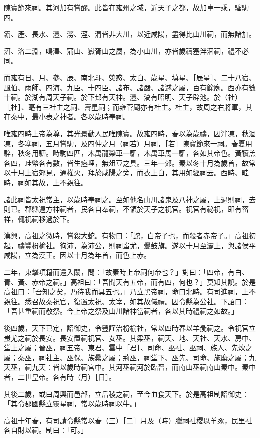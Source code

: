 \begin{pinyinscope}
陳寶節來祠。其河加有嘗醪。此皆在雍州之域，近天子之都，故加車一乘，騮駒四。

霸、產、長水、灃、澇、涇、渭皆非大川，以近咸陽，盡得比山川祠，而無諸加。

汧、洛二淵，鳴澤、蒲山、嶽胥山之屬，為小山川，亦皆歲禱塞泮涸祠，禮不必同。

而雍有日、月、參、辰、南北斗、熒惑、太白、歲星、填星、［辰星］、二十八宿、風伯、雨師、四海、九臣、十四臣、諸布、諸嚴、諸逑之屬，百有餘廟。西亦有數十祠。於湖有周天子祠。於下邽有天神。灃、滈有昭明、天子辟池。於（社）［杜］、亳有三社主之祠、壽星祠；而雍菅廟亦有杜主。杜主，故周之右將軍，其在秦中，最小表之神者。各以歲時奉祠。

唯雍四畤上帝為尊，其光景動人民唯陳寶。故雍四畤，春以為歲禱，因泮凍，秋涸凍，冬塞祠，五月嘗駒，及四仲之月（祠若）月祠，［若］陳寶節來一祠。春夏用騂，秋冬用駵。畤駒四匹，木禺龍欒車一駟，木禺車馬一駟，各如其帝色。黃犢羔各四，珪幣各有數，皆生瘞埋，無俎豆之具。三年一郊。秦以冬十月為歲首，故常以十月上宿郊見，通權火，拜於咸陽之旁，而衣上白，其用如經祠云。西畤、畦畤，祠如其故，上不親往。

諸此祠皆太祝常主，以歲時奉祠之。至如他名山川諸鬼及八神之屬，上過則祠，去則已。郡縣遠方神祠者，民各自奉祠，不領於天子之祝官。祝官有祕祝，即有菑祥，輒祝祠移過於下。

漢興，高祖之微時，嘗殺大蛇。有物曰：「蛇，白帝子也，而殺者赤帝子。」高祖初起，禱豐枌榆社。徇沛，為沛公，則祠蚩尤，釁鼓旗。遂以十月至灞上，與諸侯平咸陽，立為漢王。因以十月為年首，而色上赤。

二年，東擊項籍而還入關，問：「故秦時上帝祠何帝也？」對曰：「四帝，有白、青、黃、赤帝之祠。」高祖曰：「吾聞天有五帝，而有四，何也？」莫知其說。於是高祖曰：「吾知之矣，乃待我而具五也。」乃立黑帝祠，命曰北畤。有司進祠，上不親往。悉召故秦祝官，復置太祝、太宰，如其故儀禮。因令縣為公社。下詔曰：「吾甚重祠而敬祭。今上帝之祭及山川諸神當祠者，各以其時禮祠之如故。」

後四歲，天下已定，詔御史，令豐謹治枌榆社，常以四時春以羊彘祠之。令祝官立蚩尤之祠於長安。長安置祠祝官、女巫。其梁巫，祠天、地、天社、天水、房中、堂上之屬；晉巫，祠五帝、東君、雲中［君］、司命、巫社、巫祠、族人、先炊之屬；秦巫，祠社主、巫保、族纍之屬；荊巫，祠堂下、巫先、司命、施糜之屬；九天巫，祠九天：皆以歲時祠宮中。其河巫祠河於臨晉，而南山巫祠南山秦中。秦中者，二世皇帝。各有時（月）［日］。

其後二歲，或曰周興而邑邰，立后稷之祠，至今血食天下。於是高祖制詔御史：「其令郡國縣立靈星祠，常以歲時祠以牛。」

高祖十年春，有司請令縣常以春（三）［二］月及（時）臘祠社稷以羊豕，民里社各自財以祠。制曰：「可。」


\end{pinyinscope}
